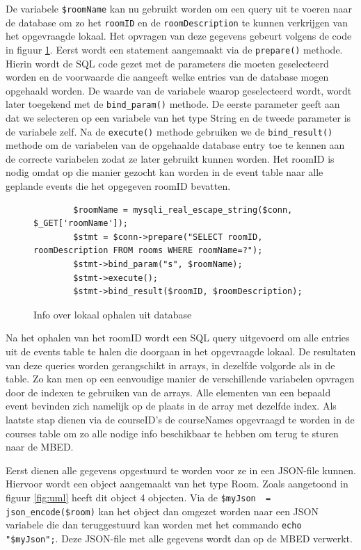\documentclass[a4paper,kul]{kulakarticle} %
\begin{document}
De variabele \verb|$roomName| kan nu gebruikt worden om een query uit te voeren naar de database om zo het \verb|roomID| en de \verb|roomDescription| te kunnen verkrijgen van het opgevraagde lokaal. Het opvragen van deze gegevens gebeurt volgens de code in figuur \ref{fig:roomsql}. Eerst wordt een statement aangemaakt via de \verb|prepare()| methode. Hierin wordt de SQL code gezet met de parameters die moeten geselecteerd worden en de voorwaarde die aangeeft welke entries van de database mogen opgehaald worden. De waarde van de variabele waarop geselecteerd wordt, wordt later toegekend met de \verb|bind_param()| methode. De eerste parameter geeft aan dat we selecteren op een variabele van het type String en de tweede parameter is de variabele zelf. Na de \verb|execute()| methode gebruiken we de \verb|bind_result()| methode om de variabelen van de opgehaalde database entry toe te kennen aan de correcte variabelen zodat ze later gebruikt kunnen worden.  Het roomID is nodig omdat op die manier gezocht kan worden in de event table naar alle geplande events die het opgegeven roomID bevatten.

\begin{figure}
	\begin{verbatim}
		$roomName = mysqli_real_escape_string($conn, $_GET['roomName']);
		$stmt = $conn->prepare("SELECT roomID, roomDescription FROM rooms WHERE roomName=?");
		$stmt->bind_param("s", $roomName);
		$stmt->execute();
		$stmt->bind_result($roomID, $roomDescription);
	\end{verbatim}
	\caption{Info over lokaal ophalen uit database}
	\label{fig:roomsql}
\end{figure}
\newpage
Na het ophalen van het roomID wordt een SQL query uitgevoerd om alle entries uit de events table te halen die doorgaan in het opgevraagde lokaal. De resultaten van deze queries worden gerangschikt in arrays, in dezelfde volgorde als in de table. Zo kan men op een eenvoudige manier de verschillende variabelen opvragen door de indexen te gebruiken van de arrays. Alle elementen van een bepaald event bevinden zich namelijk op de plaats in de array met dezelfde index. Als laatste stap dienen via de courseID's de courseNames opgevraagd te worden in de courses table om zo alle nodige info beschikbaar te hebben om terug te sturen naar de MBED.

Eerst dienen alle gegevens opgestuurd te worden voor ze in een JSON-file kunnen. Hiervoor wordt een object aangemaakt van het type Room. Zoals aangetoond in figuur \ref{fig:uml} heeft dit object 4 objecten. Via de \verb|$myJson  = json_encode($room)| kan het object dan omgezet worden naar een JSON variabele die dan teruggestuurd kan worden met het commando \verb|echo "$myJson";|. Deze JSON-file met alle gegevens wordt dan op de MBED verwerkt.
\end{document}
